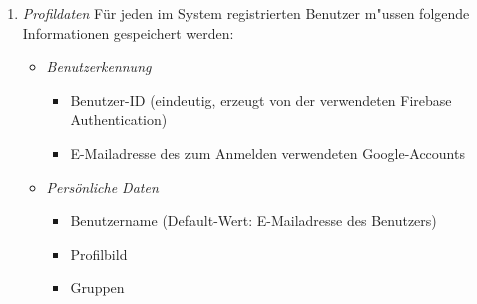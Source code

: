\documentclass[parskip=full]{scrartcl}
\def\threedigits#1{%
  \ifnum#1<100 0\fi
  \ifnum#1<10 0\fi
  \number#1}
\begin{document}
\begin{enumerate}[label={\textbf{/D\protect\threedigits{\theenumi}0/}}, leftmargin=*]
	\item \textit{Profildaten} \label{Profildaten} Für jeden im System registrierten Benutzer m"ussen folgende Informationen gespeichert werden:
		\begin{itemize}
			\item \textit{Benutzerkennung}
				\begin{itemize}
					\item Benutzer-ID (eindeutig, erzeugt von der verwendeten Firebase Authentication)
					\item E-Mailadresse des zum Anmelden verwendeten Google-Accounts
				\end{itemize}
			\item \textit{Persönliche Daten} \label{persönliche Daten} 
			\begin{itemize}
			\item \gls{Benutzername} (Default-Wert: E-Mailadresse des Benutzers)
			\item Profilbild
			\item Gruppen
		\end{itemize}
		\end{itemize}
	

\end{enumerate}
\end{document}
